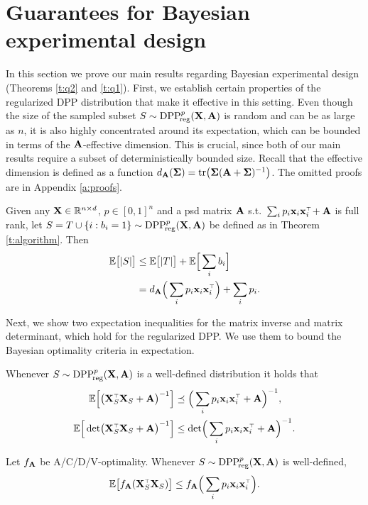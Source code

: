 \documentclass[thesis.tex]{subfiles}
\begin{document}
\section{Guarantees for Bayesian experimental design}
\label{s:guarantees}
In this section we prove our main results regarding Bayesian
experimental design (Theorems \ref{t:q2} and \ref{t:q1}). First, we
establish certain properties of the regularized DPP distribution that
make it effective in this setting. Even though the size of the
sampled subset $S\sim{{\mathrm{DPP}}_{\!\mathrm{reg}}^{p}}(\mathbf X,\mathbf A)$ is random and can be as large
as $n$, it is also highly concentrated around its expectation, which
can be bounded in terms of the $\mathbf A$-effective dimension. This is
crucial, since both of our main results require a subset of
deterministically bounded size. Recall that the effective dimension is
defined as a function $d_{\mathbf A}(\mathbf{\Sigma}) =
\mathrm{tr}\big(\mathbf{\Sigma}(\mathbf A+\mathbf{\Sigma})^{-1}\big)$. The omitted proofs are in
Appendix \ref{a:proofs}.
\begin{lemma}\label{l:size}
  Given any $\mathbf X\in\mathbb R^{n\times d}$, $p\in[0,1]^n$ and a psd matrix $\mathbf A$
s.t.~$\sum_ip_i\x_i\x_i^\top\!+\A$ is
full rank, let $S=T\cup \{i:b_i=1\}\sim {{\mathrm{DPP}}_{\!\mathrm{reg}}^{p}}(\mathbf X,\mathbf A)$ be defined
as in Theorem \ref{t:algorithm}. Then
\begin{align*}
  \E\big[|S|\big] &\leq \E\big[|T|\big] + \E\Big[\sum_i b_i\Big]  \\
                  & = d_{\A}\Big(\sum_ip_i\x_i\x_i^\top\Big) + \sum_i p_i.
\end{align*}
\end{lemma}
Next, we show two expectation inequalities for the matrix inverse and
matrix determinant, which hold for the regularized DPP.
We use them to bound the Bayesian optimality criteria in expectation.
\begin{lemma}\label{t:expectations}
Whenever $S\sim {{\mathrm{DPP}}_{\!\mathrm{reg}}^{p}}(\mathbf X,\mathbf A)$ is a well-defined distribution it holds that
\begin{align}
  \E\Big[\big(\X_S^\top\X_S+\A\big)^{-1}\Big]
  &\preceq \Big(
    \sum_ip_i\x_i\x_i^\top +\A \Big)^{-1},\label{eq:sqinv}
  \\
\E\Big[\det\!\big(\X_S^\top\X_S+\A\big)^{-1}\Big]
  &\leq\det\!\Big(
    \sum_ip_i\x_i\x_i^\top +\A \Big)^{-1}.\label{eq:det}
\end{align}
\end{lemma}
\begin{corollary}\label{c:expectations}
Let $f_{\mathbf A}$ be A/C/D/V-optimality. Whenever $S\sim{{\mathrm{DPP}}_{\!\mathrm{reg}}^{p}}(\mathbf X,\mathbf A)$ is
well-defined,
\begin{align*}
  \E\big[f_{\A}(\X_S^\top\X_S)\big] \leq f_{\A}\Big(\sum_i p_i\x_i\x_i^\top\Big).
\end{align*}
\end{corollary}
\end{document}
